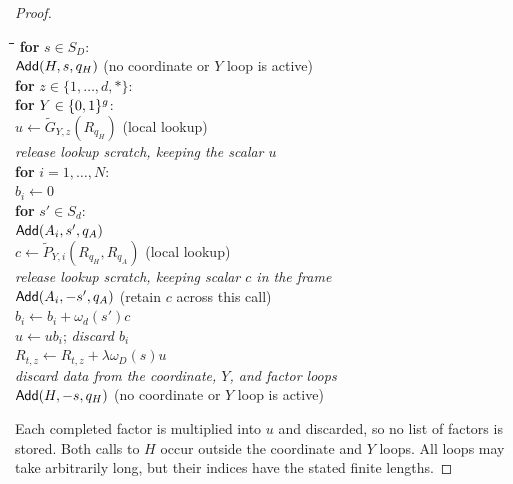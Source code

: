 \begin{proof}
\begin{small}
\begin{tabbing}
\hspace{1.4em}\=\hspace{1.4em}\=\hspace{1.4em}\=\hspace{1.4em}\=\hspace{1.4em}\=\kill
\textbf{for} $s\in S_D$:\\
\> $\mathsf{Add}(H,s,q_H)$ \quad (no coordinate or $Y$ loop is active)\\
\> \textbf{for} $z\in\{1,\ldots,d,*\}$:\\
\>\> \textbf{for} $Y\in\{0,1\}^g$:\\
\>\>\> $u\leftarrow\widetilde G_{Y,z}(R_{q_H})$ \quad (local lookup)\\
\>\>\> \textit{release lookup scratch, keeping the scalar $u$}\\
\>\>\> \textbf{for} $i=1,\ldots,N$:\\
\>\>\>\> $b_i\leftarrow0$\\
\>\>\>\> \textbf{for} $s'\in S_d$:\\
\>\>\>\>\> $\mathsf{Add}(A_i,s',q_A)$\\
\>\>\>\>\> $c\leftarrow\widetilde P_{Y,i}(R_{q_H},R_{q_A})$ \quad (local lookup)\\
\>\>\>\>\> \textit{release lookup scratch, keeping scalar $c$ in the frame}\\
\>\>\>\>\> $\mathsf{Add}(A_i,-s',q_A)$ \quad (retain $c$ across this call)\\
\>\>\>\>\> $b_i\leftarrow b_i+\omega_d(s')c$\\
\>\>\>\> $u\leftarrow u b_i$; \textit{ discard $b_i$}\\
\>\>\> $R_{t,z}\leftarrow R_{t,z}+\lambda\omega_D(s)u$\\
\> \textit{discard data from the coordinate, $Y$, and factor loops}\\
\> $\mathsf{Add}(H,-s,q_H)$ \quad (no coordinate or $Y$ loop is active)
\end{tabbing}
\end{small}

Each completed factor is multiplied into $u$ and discarded, so no list of
factors is stored.  Both calls to $H$ occur outside the coordinate and $Y$
loops.  All loops may take arbitrarily long, but their indices have the
stated finite lengths.


\end{proof}
